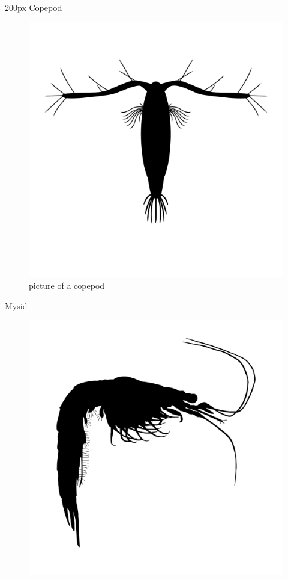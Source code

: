 \documentclass[
]{book}
\begin{document}
\begin{column}{200px\textwidth}
Copepod

\begin{figure}

{\centering \includegraphics[width=16.67in]{figures/acartia} 

}

\caption{picture of a copepod}\label{fig:unnamed-chunk-67}
\end{figure}

Mysid

\begin{figure}

{\centering \includegraphics[width=16.67in]{figures/mysid} 

}
\end{figure}
\end{column}
\end{document}
